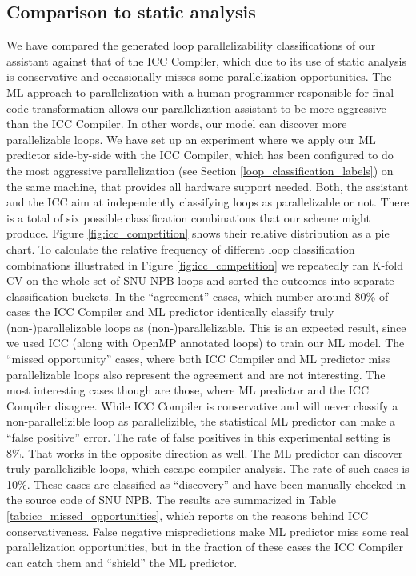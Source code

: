 \subsection{Comparison to static analysis}
\label{assistant_predictor_vs_icc}
\quad We have compared the generated loop parallelizability classifications of our assistant against that of the ICC Compiler, which due to its use of static analysis is conservative and occasionally misses some parallelization opportunities. The ML approach to parallelization with a human programmer responsible for final code transformation allows our parallelization assistant to be more aggressive than the ICC Compiler. In other words, our model can discover more parallelizable loops.\newline\null
\quad We have set up an experiment where we apply our ML predictor side-by-side with the ICC Compiler, which has been configured to do the most aggressive parallelization (see Section \ref{loop_classification_labels}) on the same machine, that provides all hardware support needed. Both, the assistant and the ICC aim at independently classifying loops as parallelizable or not. There is a total of six possible classification combinations that our scheme might produce. Figure \ref{fig:icc_competition} shows their relative distribution as a pie chart. To calculate the relative frequency of different loop classification combinations illustrated in Figure \ref{fig:icc_competition} we repeatedly ran K-fold CV on the whole set of SNU NPB loops and sorted the outcomes into separate classification buckets. In the ``agreement'' cases, which number around 80\% of cases the ICC Compiler and ML predictor identically classify truly (non-)parallelizable loops as (non-)parallelizable. This is an expected result, since we used ICC (along with OpenMP annotated loops) to train our ML model. The ``missed opportunity'' cases, where both ICC Compiler and ML predictor miss parallelizable loops also represent the agreement and are not interesting. The most interesting cases though are those, where ML predictor and the ICC Compiler disagree. While ICC Compiler is conservative and will never classify a non-parallelizible loop as parallelizible, the statistical ML predictor can make a ``false positive'' error. The rate of false positives in this experimental setting is 8\%. That works in the opposite direction as well. The ML predictor can discover truly parallelizible loops, which escape compiler analysis. The rate of such cases is 10\%. These cases are classified as ``discovery'' and have been manually checked in the source code of SNU NPB. The results are summarized in Table \ref{tab:icc_missed_opportunities}, which reports on the reasons behind ICC conservativeness. False negative mispredictions make ML predictor miss some real parallelization opportunities, but in the fraction of these cases the ICC Compiler can catch them and ``shield'' the ML predictor.

